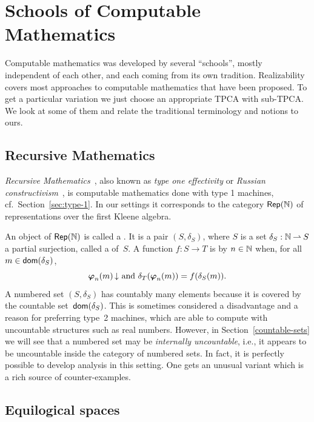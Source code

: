 \section{Schools of Computable Mathematics}
\label{sec:schools}

Computable mathematics was developed by several ``schools'', mostly
independent of each other, and each coming from its own tradition.
Realizability covers most approaches to computable mathematics that
have been proposed. To get a particular variation we just choose an
appropriate TPCA with sub-TPCA. We look at some of them and relate the
traditional terminology and notions to ours.

\subsection{Recursive Mathematics}
\label{sec:recursive-math}

\emph{Recursive Mathematics}~, also known as \emph{type
  one effectivity} or \emph{Russian constructivism}~, is
computable mathematics done with type 1 machines, cf.\
Section~\ref{sec:type-1}. In our settings it corresponds to the
category $\mathsf{Rep}(\mathbb{N})$ of representations over the first Kleene algebra.

An object of $\mathsf{Rep}(\mathbb{N})$ is called a . It is a pair
$(S, \delta_S)$, where $S$ is a set $\delta_S : \mathbb{N} \mathbin{\rightharpoonup} S$ a
partial surjection, called a  of~$S$. A function $f :
S \to T$ is \defemph{realized} by $n \in \mathbb{N}$ when, for all $m \in
\mathsf{dom}(\delta_S)$,
%
\begin{equation*}
  \text{$\text{\boldmath{$\varphi$}}_{n}(m)\,{\downarrow}$ and $\delta_T(\text{\boldmath{$\varphi$}}_{n}(m)) = f(\delta_S(m))$.}
\end{equation*}
%
A numbered set $(S, \delta_S)$ has countably many elements because it
is covered by the countable set~$\mathsf{dom}(\delta_S)$. This is sometimes
considered a disadvantage and a reason for preferring type~2 machines,
which are able to compute with uncountable structures such as real
numbers. However, in Section~\ref{countable-sets} we will see that a
numbered set may be \emph{internally uncountable}, i.e., it appears to
be uncountable inside the category of numbered sets. In fact, it is
perfectly possible to develop analysis in this setting. One gets an
unusual variant which is a rich source of counter-examples.

\subsection{Equilogical spaces}
\label{sec:equilogical-spaces}

